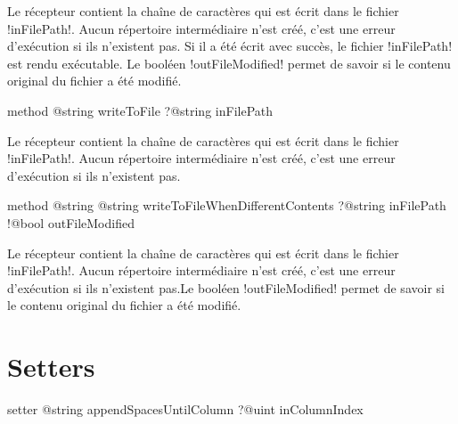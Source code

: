Le récepteur contient la chaîne de caractères qui est écrit dans le fichier \ggst!inFilePath!. Aucun répertoire intermédiaire n'est créé, c'est une erreur d'exécution si ils n'existent pas. Si il a été écrit avec succès, le fichier \ggst!inFilePath! est rendu exécutable. Le booléen \ggst!outFileModified! permet de savoir si le contenu original du fichier a été modifié.










\begin{galgas3box}
method @string writeToFile ?@string inFilePath
\end{galgas3box}

Le récepteur contient la chaîne de caractères qui est écrit dans le fichier \ggst!inFilePath!. Aucun répertoire intermédiaire n'est créé, c'est une erreur d'exécution si ils n'existent pas.










\begin{galgas3box}
method @string @string writeToFileWhenDifferentContents
    ?@string inFilePath
    !@bool outFileModified
\end{galgas3box}

Le récepteur contient la chaîne de caractères qui est écrit dans le fichier \ggst!inFilePath!. Aucun répertoire intermédiaire n'est créé, c'est une erreur d'exécution si ils n'existent pas.Le booléen \ggst!outFileModified! permet de savoir si le contenu original du fichier a été modifié.















\section{Setters}


\begin{galgas3box}
setter @string appendSpacesUntilColumn ?@uint inColumnIndex
\end{galgas3box}

